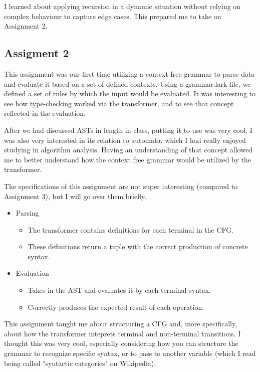 \documentclass{article}
\theoremstyle{theorem}
\theoremstyle{definition}
\theoremstyle{remark}
\begin{document}
I learned about applying recursion in a dynamic situation without relying on complex behaviour to capture edge cases. This prepared me to take on Assignment 2.\\

\subsection{Assigment 2}
This assignment was our first time utilizing a context free grammar to parse data and evaluate it based on a set of defined contexts. Using a grammar.lark file, we defined a set of rules by which the input would be evaluated. It was interesting to see how type-checking worked via the transformer, and to see that concept reflected in the evaluation.

After we had discussed ASTs in length in class, putting it to use was very cool. I was also very interested in its relation to automata, which I had really enjoyed studying in algorithm analysis. Having an understanding of that concept allowed me to better understand how the context free grammar would be utilized by the transformer.

The specifications of this assignment are not super interesting (compared to Assignment 3), but I will go over them briefly.

\begin{itemize}
  \item Parsing
    \begin{itemize}
      \item The transformer contains definitions for each terminal in the CFG.
      \item These definitions return a tuple with the correct production of concrete syntax.
    \end{itemize}
  \item Evaluation
    \begin{itemize}
      \item Takes in the AST and evaluates it by each terminal syntax.
      \item Correctly produces the expected result of each operation.
    \end{itemize}
\end{itemize}

This assignment taught me about structuring a CFG and, more specifically, about how the transformer inteprets terminal and non-terminal transitions. I thought this was very cool, especially considering how you can structure the grammar to recognize specific syntax, or to pass to another variable (which I read being called "syntactic categories" on Wikipedia).
\end{document}
